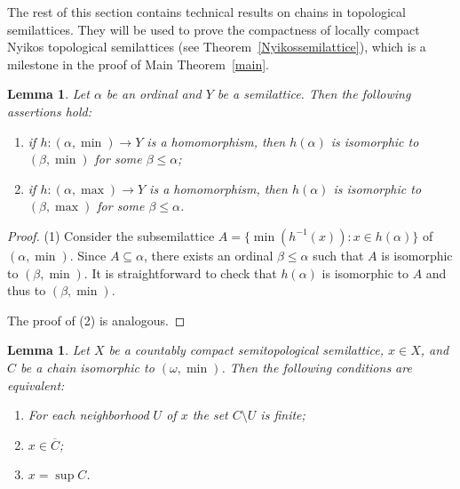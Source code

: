 \documentclass[12pt, twoside, leqno]{article}
\newtheorem{lemma}[theorem]{Lemma}
\theoremstyle{definition}
\numberwithin{equation}{section}
\newcommand{\w}{\omega}
\begin{document}
The rest of this section contains technical results on chains in topological semilattices. They will be used to prove the compactness of locally compact Nyikos topological semilattices (see Theorem~\ref{Nyikossemilattice}), which is a milestone in the proof of Main Theorem~\ref{main}.


\begin{lemma}\label{folknew}
Let $\alpha$ be an ordinal and $Y$ be a semilattice. Then the following assertions hold:
\begin{enumerate}[label=(\arabic*)] 
    \item if $h:(\alpha,\min)\rightarrow Y$ is a homomorphism, then $h(\alpha)$ is isomorphic to $(\beta,\min)$ for some $\beta\leq\alpha$;
    \item if $h:(\alpha,\max)\rightarrow Y$ is a homomorphism, then $h(\alpha)$ is isomorphic to $(\beta,\max)$ for some $\beta\leq\alpha$.
\end{enumerate}     
\end{lemma}

\begin{proof}
(1) Consider the subsemilattice $A=\{\min (h^{-1}(x)): x\in h(\alpha)\}$ of $(\alpha,\min)$. Since $A\subseteq \alpha$, there exists an ordinal $\beta\leq \alpha$ such that $A$ is isomorphic to $(\beta,\min)$. It is straightforward to check that $h(\alpha)$ is isomorphic to $A$ and thus to $(\beta,\min)$. 

The proof of (2) is analogous. 
\end{proof}




\begin{lemma}\label{sup}
Let $X$ be a countably compact semitopological semilattice, $x\in X$, and $C$ be a chain isomorphic to $(\w,\min)$. Then the following conditions are equivalent:
\begin{enumerate}[label=(\arabic*)] 
    \item For each neighborhood $U$ of $x$ the set $C\setminus U$ is finite;
    \item $x\in \overline{C}$;
    \item $x=\sup C$.
\end{enumerate} 
\end{lemma}
\end{document}
